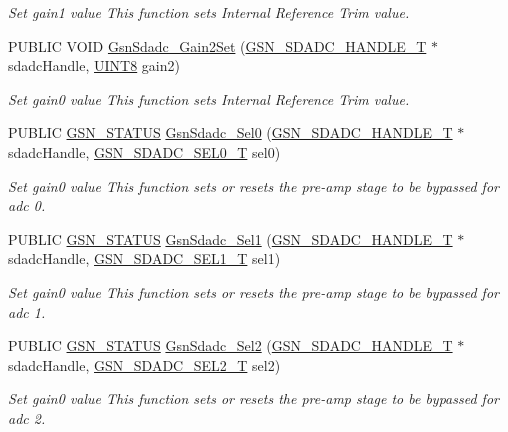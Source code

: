 \begin{DoxyCompactItemize}
\begin{DoxyCompactList}\small\item\em Set gain1 value This function sets Internal Reference Trim value. \end{DoxyCompactList}\item 
PUBLIC VOID \hyperlink{a00652_gad175282ee968f03610da89e97679f271}{GsnSdadc\_\-Gain2Set} (\hyperlink{a00214}{GSN\_\-SDADC\_\-HANDLE\_\-T} $\ast$sdadcHandle, \hyperlink{a00660_gab27e9918b538ce9d8ca692479b375b6a}{UINT8} gain2)
\begin{DoxyCompactList}\small\item\em Set gain0 value This function sets Internal Reference Trim value. \end{DoxyCompactList}\item 
PUBLIC \hyperlink{a00660_gada5951904ac6110b1fa95e51a9ddc217}{GSN\_\-STATUS} \hyperlink{a00652_ga667622c288ed2b8c3319c4724cb78639}{GsnSdadc\_\-Sel0} (\hyperlink{a00214}{GSN\_\-SDADC\_\-HANDLE\_\-T} $\ast$sdadcHandle, \hyperlink{a00652_ga1211f3eac3c8c6697324a356da4dbcb7}{GSN\_\-SDADC\_\-SEL0\_\-T} sel0)
\begin{DoxyCompactList}\small\item\em Set gain0 value This function sets or resets the pre-\/amp stage to be bypassed for adc 0. \end{DoxyCompactList}\item 
PUBLIC \hyperlink{a00660_gada5951904ac6110b1fa95e51a9ddc217}{GSN\_\-STATUS} \hyperlink{a00652_ga7a72fd1faaa79943f28aa6492c0a829d}{GsnSdadc\_\-Sel1} (\hyperlink{a00214}{GSN\_\-SDADC\_\-HANDLE\_\-T} $\ast$sdadcHandle, \hyperlink{a00652_ga851e1269993bbdc128b392fd7216ade7}{GSN\_\-SDADC\_\-SEL1\_\-T} sel1)
\begin{DoxyCompactList}\small\item\em Set gain0 value This function sets or resets the pre-\/amp stage to be bypassed for adc 1. \end{DoxyCompactList}\item 
PUBLIC \hyperlink{a00660_gada5951904ac6110b1fa95e51a9ddc217}{GSN\_\-STATUS} \hyperlink{a00652_ga782d3ae7b52dc4521f12de44613ef2a0}{GsnSdadc\_\-Sel2} (\hyperlink{a00214}{GSN\_\-SDADC\_\-HANDLE\_\-T} $\ast$sdadcHandle, \hyperlink{a00652_ga21776f699fb060e738c464107e435df4}{GSN\_\-SDADC\_\-SEL2\_\-T} sel2)
\begin{DoxyCompactList}\small\item\em Set gain0 value This function sets or resets the pre-\/amp stage to be bypassed for adc 2. \end{DoxyCompactList}\item 

\end{DoxyCompactItemize}
